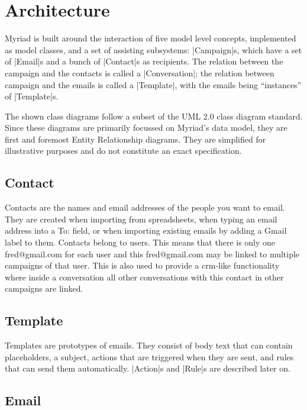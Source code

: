 \section{Architecture}
\label{sec:Architecture}

Myriad is built around the interaction of five model level concepts, implemented as model classes, and a set of assisting subsystems:
|Campaign|s, which have a set of |Email|s and a bunch of |Contact|s as recipients. The relation between the campaign and the contacts is called a |Conversation|; the relation between campaign and the emails is called a |Template|, with the emails being ``instances'' of |Template|s.

The shown class diagrams follow a subset of the UML 2.0 class diagram standard\cite{uml}. Since these diagrams are primarily focussed on Myriad's data model, they are first and foremost Entity Relationship diagrams. They are simplified for illustrative purposes and do not constitute an exact specification.



\subsection{Contact}

Contacts are the names and email addresses of the people you want to email.
They are created when importing from spreadsheets, when typing an email address into a To: field, or when importing existing emails by adding a Gmail label to them. Contacts belong to users. This means that there is only one fred@gmail.com for each user and this fred@gmail.com may be linked to multiple campaigns of that user. This is also used to provide a \gls{crm}-like functionality where inside a conversation all other conversations with this contact in other campaigns are linked.

\subsection{Template}

Templates are prototypes of emails. They consist of body text that can contain placeholders, a subject, actions that are triggered when they are sent, and rules that can send them automatically. |Action|s and |Rule|s are described later on.

\subsection{Email}


